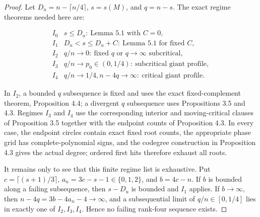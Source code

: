 \documentclass[10pt]{article}
\begin{document}
\begin{proof}


Let $D_u=n-\lceil n/4\rceil$, $s=s(M)$, and $q=n-s$.  The exact
regime theorems needed here are:

\[
 \begin{array}{c|l}
 I_0&s\le D_u:\ \text{Lemma 5.1 with }C=0,\\
 I_1&D_u<s\le D_u+C:\ \text{Lemma 5.1 for fixed }C,\\
 I_2&q/n\to0:\ \text{fixed }q\text{ or }q\to\infty\text{ subcritical},\\
 I_3&q/n\to p_0\in(0,1/4):\ \text{subcritical giant profile},\\
 I_4&q/n\to1/4, n-4q\to\infty:\ \text{critical giant profile}.
 \end{array} \tag{5.7}
\]

In $I_2$, a bounded $q$ subsequence is fixed and uses the exact
fixed-complement theorem, Proposition 4.4; a divergent $q$ subsequence uses
Propositions 3.5 and 4.3.  Regimes $I_3$ and $I_4$ use the corresponding
interior and moving-critical clauses of Proposition 3.5 together with the
endpoint counts of Proposition 4.3.  In every case, the endpoint circles contain exact fixed
root counts, the appropriate phase grid has complete-polynomial signs, and
the codegree construction in Proposition 4.3 gives the actual degree; ordered
first hits therefore exhaust all roots.

It remains only to see that this finite regime list is exhaustive.  Put
$c=\lceil(s+1)/3\rceil$,
$a_n=3c-s-1\in\{0,1,2\}$, and $b=4c-n$.  If $b$ is bounded along a
failing subsequence, then $s-D_u$ is bounded and $I_1$ applies.  If
$b\to\infty$, then $n-4q=3b-4a_n-4\to\infty$, and a subsequential limit
of $q/n\in[0,1/4]$ lies in exactly one of $I_2,I_3,I_4$.  Hence no failing
rank-four sequence exists.
\end{proof}
\end{document}
